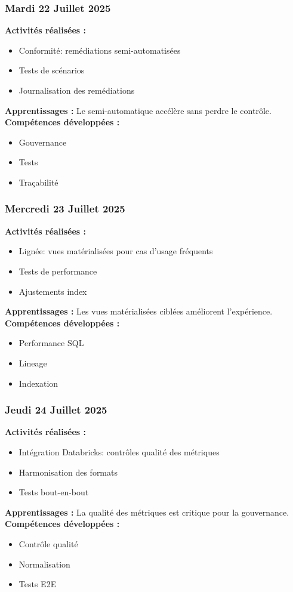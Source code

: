 \documentclass[12pt,a4paper]{article}
\begin{document}
\subsubsection{Mardi 22 Juillet 2025}
\textbf{Activités réalisées :}
\begin{itemize}
    \item Conformité: remédiations semi-automatisées
    \item Tests de scénarios
    \item Journalisation des remédiations
\end{itemize}
\textbf{Apprentissages :} Le semi-automatique accélère sans perdre le contrôle.
\textbf{Compétences développées :}
\begin{itemize}
    \item Gouvernance
    \item Tests
    \item Traçabilité
\end{itemize}

\subsubsection{Mercredi 23 Juillet 2025}
\textbf{Activités réalisées :}
\begin{itemize}
    \item Lignée: vues matérialisées pour cas d'usage fréquents
    \item Tests de performance
    \item Ajustements index
\end{itemize}
\textbf{Apprentissages :} Les vues matérialisées ciblées améliorent l'expérience.
\textbf{Compétences développées :}
\begin{itemize}
    \item Performance SQL
    \item Lineage
    \item Indexation
\end{itemize}

\subsubsection{Jeudi 24 Juillet 2025}
\textbf{Activités réalisées :}
\begin{itemize}
    \item Intégration Databricks: contrôles qualité des métriques
    \item Harmonisation des formats
    \item Tests bout-en-bout
\end{itemize}
\textbf{Apprentissages :} La qualité des métriques est critique pour la gouvernance.
\textbf{Compétences développées :}
\begin{itemize}
    \item Contrôle qualité
    \item Normalisation
    \item Tests E2E
\end{itemize}
\end{document}
